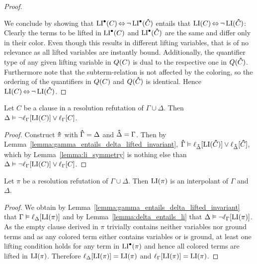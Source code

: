 \begin{proof}
\begin{itemize}
\begin{itemize}
	\end{itemize}

	\end{itemize}


	We conclude by showing that 
	$\operatorname{LI}^\bullet(C) \operatorname{\Leftrightarrow} \lnot \operatorname{LI}^\bullet(\bm\hat C)$ 
	entails that 
	$\operatorname{LI}(C) \operatorname{\Leftrightarrow} \lnot \operatorname{LI}(\bm\hat C)$:
	Clearly the terms to be lifted in $\operatorname{LI}^\bullet(C)$ and $\operatorname{LI}^\bullet(\bm\hat C)$ are the same and differ only in their color.
	Even though this results in different lifting variables, that is of no relevance as all lifted variables are instantly bound.
	Additionally, the quantifier type of any given lifting variable in $Q(C)$ is dual to the respective one in $Q(\bm\hat C)$.
	Furthermore note that the subterm-relation is not affected by the coloring, so the ordering of the quantifiers in $Q(C)$ and $Q(\bm\hat C)$ is identical.
	Hence 
	$\operatorname{LI}(C) \operatorname{\Leftrightarrow} \lnot \operatorname{LI}(\bm\hat C)$.
\end{proof}


\begin{lemma}
	\label{lemma:delta_entails_li}
	Let $C$ be a clause in a resolution refutation of $\Gamma \cup \Delta$.
	Then
	$\Delta \vDash \lnot\ell_{\Gamma}[\operatorname{LI}(C)] \lor \ell_{\Gamma}[C]$.
\end{lemma}
\begin{proof}
	Construct $\bm\hat \pi$ with $\bm\hat \Gamma = \Delta$ and $\bm\hat \Delta = \Gamma$. 
	Then by Lemma~\ref{lemma:gamma_entails_delta_lifted_invariant}, $\bm\hat \Gamma \vDash \ell_{\bm\hat \Delta}[\operatorname{LI}(\bm\hat C)] \lor \ell_{\bm\hat \Delta}[\bm\hat C]$, 
	which by Lemma~\ref{lemma:li_symmetry} is nothing else than
	$\Delta \vDash \lnot \ell_{\Gamma}[\operatorname{LI}(C)] \lor \ell_{\Gamma}[C]$.
\end{proof}

\begin{thm}
	Let $\pi$ be a resolution refutation of $\Gamma \cup \Delta$.
	Then $\operatorname{LI}(\pi)$ is an interpolant of $\Gamma$ and $\Delta$.
\end{thm}
\begin{proof}
	We obtain by Lemma~\ref{lemma:gamma_entails_delta_lifted_invariant} that  $\Gamma \vDash \ell_{\Delta}[\operatorname{LI}(\pi)]$ and
	by Lemma~\ref{lemma:delta_entails_li} that
	$\Delta \vDash \lnot\ell_{\Gamma}[\operatorname{LI}(\pi)]$.
	As the empty clause derived in $\pi$ trivially contains neither variables nor ground terms and as any colored term either contains variables or is ground, at least one lifting condition holds for any term in $\operatorname{LI}^\bullet(\pi)$ and hence all colored terms are lifted in $\operatorname{LI}(\pi)$.
	Therefore $\ell_{\Delta}[\operatorname{LI}(\pi)] = \operatorname{LI}(\pi)$ and $\ell_{\Gamma}[\operatorname{LI}(\pi)] = \operatorname{LI}(\pi)$.
\end{proof}

